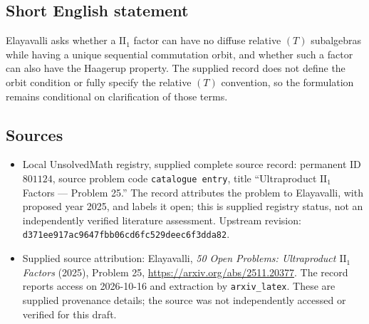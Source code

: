 \documentclass[11pt]{article}
\begin{document}
\subsection{Short English statement}
Elayavalli asks whether a \(\mathrm{II}_1\) factor can have no diffuse relative \((T)\) subalgebras while having a unique sequential commutation orbit, and whether such a factor can also have the Haagerup property. The supplied record does not define the orbit condition or fully specify the relative \((T)\) convention, so the formulation remains conditional on clarification of those terms.
\subsection{Sources}
\begin{itemize}
\item Local UnsolvedMath registry, supplied complete source record: permanent ID \(801124\), source problem code \texttt{catalogue entry}, title ``Ultraproduct \(\mathrm{II}_1\) Factors --- Problem 25.'' The record attributes the problem to Elayavalli, with proposed year 2025, and labels it open; this is supplied registry status, not an independently verified literature assessment. Upstream revision: \texttt{d371ee917ac9647fbb06cd6fc529deec6f3dda82}.
\item Supplied source attribution: Elayavalli, \emph{50 Open Problems: Ultraproduct \(\mathrm{II}_1\) Factors} (2025), Problem 25, \url{https://arxiv.org/abs/2511.20377}. The record reports access on 2026-10-16 and extraction by \texttt{arxiv\_latex}. These are supplied provenance details; the source was not independently accessed or verified for this draft.
\end{itemize}
\end{document}

